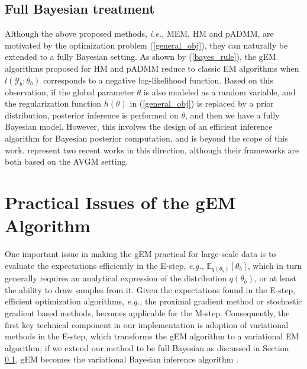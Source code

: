 \documentclass{article}
\newcommand{\ie}[0]{\emph{i.e., }}
\newcommand{\eg}[0]{\emph{e.g., }}
\newcommand{\1}[0]{\ensuremath{\boldsymbol{1}}\xspace}
\begin{document}
\subsection{Full Bayesian treatment}\label{Full_Bayesian}
Although the above proposed methods, \ie MEM, HM and pADMM, are motivated by the optimization problem (\ref{general_obj}), they can naturally be extended to a fully Bayesian setting. As shown by (\ref{bayes_rule}), the gEM algorithms proposed for HM and pADMM reduce to classic EM algorithms when $l(\mathcal{Y}_b; \theta_b)$ corresponds to a negative log-likelihood function. Based on this observation, if the global parameter $\theta$ is also modeled as a random variable, and the regularization function $h(\theta)$ in (\ref{general_obj}) is replaced by a prior distribution, posterior inference is performed on $\theta$, and then we have a fully Bayesian model. However, this involves the design of an efficient inference algorithm for Bayesian posterior computation, and is beyond the scope of this work. \cite{Scott2013, Neiswanger2013} represent two recent works in this direction, although their frameworks are both based on the AVGM setting.


\section{Practical Issues of the gEM Algorithm}\label{variational_EM}
One important issue in making the gEM practical for large-scale data is to evaluate the expectations efficiently in the E-step, \eg $\mathbb{E}_{q(\theta_b)}[\theta_b]$, which in turn generally requires an analytical expression of the distribution $q(\theta_b)$, or at least the ability to draw samples from it. Given the expectations found in the E-step, efficient optimization algorithms, \eg the proximal gradient method or stochastic gradient based methods, becomes applicable for the M-step. Consequently, the first key technical component in our implementation is adoption of variational methods \cite{Wainwright2008} in the E-step, which transforms the gEM algorithm to a variational EM algorithm; if we extend our method to be full Bayesian as discussed in Section \ref{Full_Bayesian}, gEM becomes the variational Bayesian inference algorithm \cite{Bishop2006}.
\end{document}
